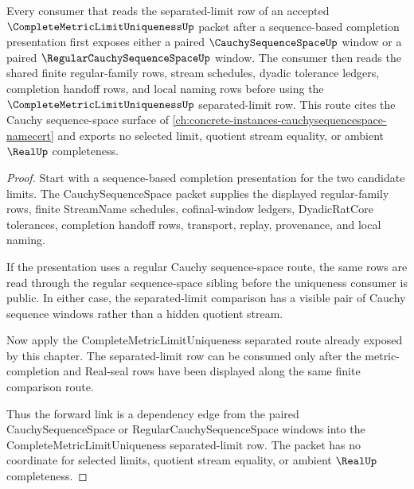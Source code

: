 \begin{theorem}
\label{thm:complete-metric-limit-uniqueness-cauchy-sequence-space-forward-link}
Every consumer that reads the separated-limit row of an accepted $\CompleteMetricLimitUniquenessUp$ packet after a sequence-based completion presentation first exposes either a paired $\CauchySequenceSpaceUp$ window or a paired $\RegularCauchySequenceSpaceUp$ window. The consumer then reads the shared finite regular-family rows, stream schedules, dyadic tolerance ledgers, completion handoff rows, and local naming rows before using the $\CompleteMetricLimitUniquenessUp$ separated-limit row. This route cites the Cauchy sequence-space surface of \autoref{ch:concrete-instances-cauchysequencespace-namecert} and exports no selected limit, quotient stream equality, or ambient $\RealUp$ completeness.
\end{theorem}
\begin{proof}
Start with a sequence-based completion presentation for the two candidate limits. The CauchySequenceSpace packet supplies the displayed regular-family rows, finite StreamName schedules, cofinal-window ledgers, DyadicRatCore tolerances, completion handoff rows, transport, replay, provenance, and local naming.

If the presentation uses a regular Cauchy sequence-space route, the same rows are read through the regular sequence-space sibling before the uniqueness consumer is public. In either case, the separated-limit comparison has a visible pair of Cauchy sequence windows rather than a hidden quotient stream.

Now apply the CompleteMetricLimitUniqueness separated route already exposed by this chapter. The separated-limit row can be consumed only after the metric-completion and Real-seal rows have been displayed along the same finite comparison route.

Thus the forward link is a dependency edge from the paired CauchySequenceSpace or RegularCauchySequenceSpace windows into the CompleteMetricLimitUniqueness separated-limit row. The packet has no coordinate for selected limits, quotient stream equality, or ambient $\RealUp$ completeness.
\end{proof}
